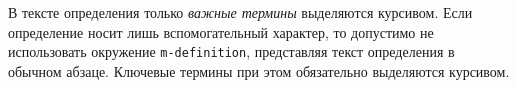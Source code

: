 \begin{m-definition}[термин] %
	\label{def:ex}
	В тексте определения только {\itshape важные термины} выделяются курсивом. Если определение носит лишь вспомогательный характер, то допустимо не использовать окружение \texttt{m-definition}, представляя текст определения в обычном абзаце. Ключевые термины при этом обязательно выделяются курсивом.
\end{m-definition}